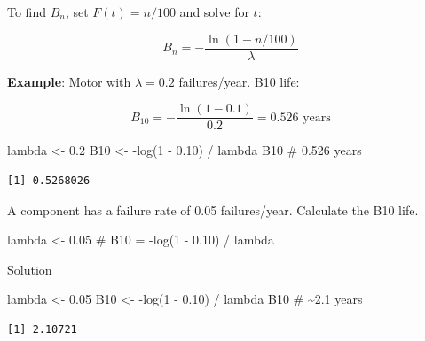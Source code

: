 \documentclass[
  letterpaper,
  DIV=11,
  numbers=noendperiod]{scrreprt}
\newenvironment{Shaded}{\begin{snugshade}}{\end{snugshade}}
\newcommand{\CommentTok}[1]{\textcolor[rgb]{0.37,0.37,0.37}{#1}}
\newcommand{\DecValTok}[1]{\textcolor[rgb]{0.68,0.00,0.00}{#1}}
\newcommand{\FloatTok}[1]{\textcolor[rgb]{0.68,0.00,0.00}{#1}}
\newcommand{\FunctionTok}[1]{\textcolor[rgb]{0.28,0.35,0.67}{#1}}
\newcommand{\NormalTok}[1]{\textcolor[rgb]{0.00,0.23,0.31}{#1}}
\newcommand{\OtherTok}[1]{\textcolor[rgb]{0.00,0.23,0.31}{#1}}
\newcommand{\SpecialCharTok}[1]{\textcolor[rgb]{0.37,0.37,0.37}{#1}}
\begin{document}
To find \(B_n\), set \(F(t) = n/100\) and solve for \(t\):

\[B_n = -\frac{\ln(1 - n/100)}{\lambda}\]

\textbf{Example}: Motor with \(\lambda = 0.2\) failures/year. B10 life:

\[B_{10} = -\frac{\ln(1 - 0.1)}{0.2} = 0.526 \text{ years}\]

\begin{Shaded}
\begin{Highlighting}[]
\NormalTok{lambda }\OtherTok{\textless{}{-}} \FloatTok{0.2}
\NormalTok{B10 }\OtherTok{\textless{}{-}} \SpecialCharTok{{-}}\FunctionTok{log}\NormalTok{(}\DecValTok{1} \SpecialCharTok{{-}} \FloatTok{0.10}\NormalTok{) }\SpecialCharTok{/}\NormalTok{ lambda}
\NormalTok{B10  }\CommentTok{\# 0.526 years}
\end{Highlighting}
\end{Shaded}

\begin{verbatim}
[1] 0.5268026
\end{verbatim}

\begin{tcolorbox}[enhanced jigsaw, arc=.35mm, bottomrule=.15mm, bottomtitle=1mm, breakable, colback=white, colbacktitle=quarto-callout-note-color!10!white, colframe=quarto-callout-note-color-frame, coltitle=black, left=2mm, leftrule=.75mm, opacityback=0, opacitybacktitle=0.6, rightrule=.15mm, title=\textcolor{quarto-callout-note-color}{\faInfo}\hspace{0.5em}{Try It}, titlerule=0mm, toprule=.15mm, toptitle=1mm]

A component has a failure rate of 0.05 failures/year. Calculate the B10
life.

\begin{Shaded}
\begin{Highlighting}[]
\NormalTok{lambda }\OtherTok{\textless{}{-}} \FloatTok{0.05}
\CommentTok{\# B10 = {-}log(1 {-} 0.10) / lambda}
\end{Highlighting}
\end{Shaded}

Solution

\begin{Shaded}
\begin{Highlighting}[]
\NormalTok{lambda }\OtherTok{\textless{}{-}} \FloatTok{0.05}
\NormalTok{B10 }\OtherTok{\textless{}{-}} \SpecialCharTok{{-}}\FunctionTok{log}\NormalTok{(}\DecValTok{1} \SpecialCharTok{{-}} \FloatTok{0.10}\NormalTok{) }\SpecialCharTok{/}\NormalTok{ lambda}
\NormalTok{B10  }\CommentTok{\# \textasciitilde{}2.1 years}
\end{Highlighting}
\end{Shaded}

\begin{verbatim}
[1] 2.10721
\end{verbatim}

\end{tcolorbox}
\end{document}
